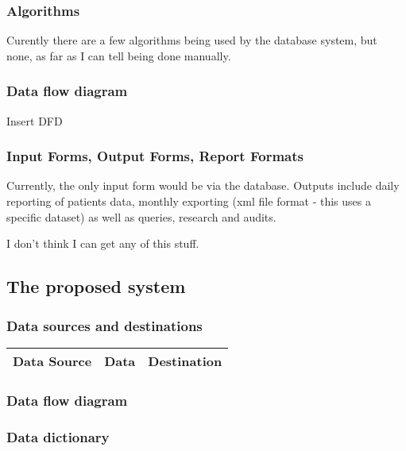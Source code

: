 \subsubsection{Algorithms}
Curently there are a few algorithms being used by the database system, but none, as far as I can tell being done manually.

\subsubsection{Data flow diagram}

Insert DFD

\subsubsection{Input Forms, Output Forms, Report Formats}
Currently, the only input form would be via the database. Outputs include daily reporting of patients data, monthly exporting (xml file format - this uses a specific dataset) as well as queries, research and audits.

I don't think I can get any of this stuff.

\subsection{The proposed system}

\subsubsection{Data sources and destinations}

\begin{center}
\begin{tabular}{|l|l|l|}
    \hline
    \textbf{Data Source} & \textbf{Data} & \textbf{Destination} \\ \hline

    \hline
\end{tabular}
\label{tab:range_examples}
\end{center}

\subsubsection{Data flow diagram}

\subsubsection{Data dictionary}

